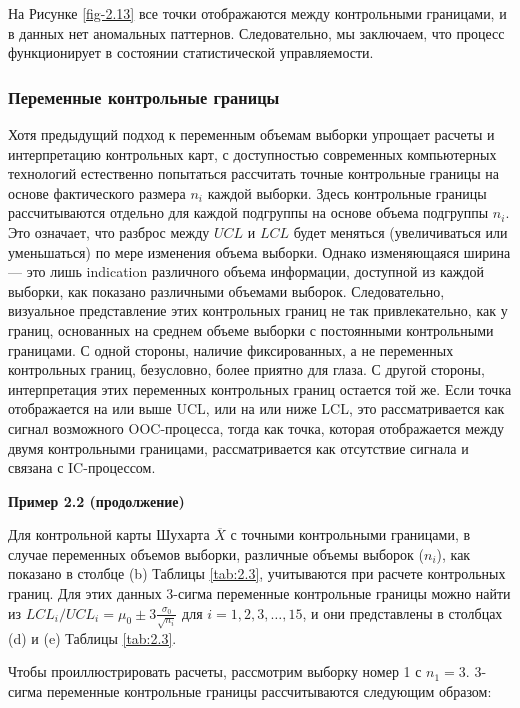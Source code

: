 На Рисунке \ref{fig-2.13} все точки отображаются между контрольными границами, и в данных нет аномальных паттернов. Следовательно, мы заключаем, что процесс функционирует в состоянии статистической управляемости.

\subsubsection{Переменные контрольные границы}

Хотя предыдущий подход к переменным объемам выборки упрощает расчеты и интерпретацию контрольных карт, с доступностью современных компьютерных технологий естественно попытаться рассчитать точные контрольные границы на основе фактического размера \(n_i\) каждой выборки. Здесь контрольные границы рассчитываются отдельно для каждой подгруппы на основе объема подгруппы \(n_i\). Это означает, что разброс между \(UCL\) и \(LCL\) будет меняться (увеличиваться или уменьшаться) по мере изменения объема выборки. Однако изменяющаяся ширина — это лишь indication различного объема информации, доступной из каждой выборки, как показано различными объемами выборок. Следовательно, визуальное представление этих контрольных границ не так привлекательно, как у границ, основанных на среднем объеме выборки с постоянными контрольными границами. С одной стороны, наличие фиксированных, а не переменных контрольных границ, безусловно, более приятно для глаза. С другой стороны, интерпретация этих переменных контрольных границ остается той же. Если точка отображается на или выше UCL, или на или ниже LCL, это рассматривается как сигнал возможного OOC-процесса, тогда как точка, которая отображается между двумя контрольными границами, рассматривается как отсутствие сигнала и связана с IC-процессом.

\noindent\textbf{Пример 2.2 (продолжение)}

Для контрольной карты Шухарта \(\overline{X}\) с точными контрольными границами, в случае переменных объемов выборки, различные объемы выборок (\(n_i\)), как показано в столбце (b) Таблицы \ref{tab:2.3}, учитываются при расчете контрольных границ. Для этих данных 3-сигма переменные контрольные границы можно найти из \(LCL_i / UCL_i = \mu_0 \pm 3\frac{\sigma_0}{\sqrt{n_i}}\) для \(i = 1, 2, 3, \ldots, 15\), и они представлены в столбцах (d) и (e) Таблицы \ref{tab:2.3}.

Чтобы проиллюстрировать расчеты, рассмотрим выборку номер 1 с \(n_1 = 3\). 3-сигма переменные контрольные границы рассчитываются следующим образом:

